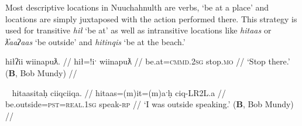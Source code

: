 \vspace{10pt}

Most descriptive locations in Nuuchahnulth are verbs, `be at a place' and locations are simply juxtaposed with the action performed there. This strategy is used for transitive \textit{hił} `be at' as well as intransitive locations like \textit{hitaas} or \textit{ƛ̓aaʔaas} `be outside' and \textit{hitinqis} `be at the beach.'

\ex \label{ex:stopthere}
\begingl
\glpreamble hiłʔii wiinapuƛ. //
\gla hił=!iˑ wiinapuƛ //
\glb be.at=\textsc{cmmd.2sg} stop.\textsc{mo} //
\glft `Stop there.' (\textbf{B}, Bob Mundy) //
\endgl
\xe

\begin{comment}
\ex \label{ex:workathome}
\begingl
\glpreamble hiłitin maḥt̓iiʔakqas mamuuk. //
\gla hił=(m)it=(m)in maḥt̓ii=ʔak=qaˑs mamuuk //
\glb be.at=\textsc{pst}=\textsc{strg.1pl} house=\textsc{poss}=\textsc{defn.1sg} work.\textsc{dr} //
\glft `We worked at my house.' (\textbf{N}, Fidelia Haiyupis) //
\endgl
\xe

\ex \label{ex:screamatbeach}
\begingl
\glpreamble n̓aʔiičiʔeƛ naʔuu łuucma ʕiikʕiika hitinqis. //
\gla n̓a-iˑčiƛ=!aƛ naʔuu łuucma ʕik-LR2L.a hitinqis //
\glb see-\textsc{in}=\textsc{now} be.with woman=\textsc{poss} scream-\textsc{rp} be.at.beach //
\glft `He heard a woman screaming on the beach.' (\textbf{C}, \textit{tupaat} Julia Lucas) //
\endgl
\xe
\end{comment}


\ex~ \label{ex:speakoutside}
\begingl
\glpreamble hitaasitaḥ ciiqciiqa. //
\gla hitaas=(m)it=(m)aˑḥ ciq-LR2L.a //
\glb be.outside=\textsc{pst}=\textsc{real.1sg} speak-\textsc{rp} //
\glft `I was outside speaking.' (\textbf{B}, Bob Mundy) //
\endgl
\xe

\begin{comment}
\ex~ \label{ex:speakoutside}
\begingl
\glpreamble qiiʔaƛintiis mamuuk ƛ̓aaʔaas. //
\gla qii=!aƛ=int=iis mamuuk ƛ̓aaʔaas //
\glb long.time=\textsc{now}=\textsc{pst}=\textsc{weak.1sg} work.\textsc{dr} be.outside //
\glft `I was working outside for a long time.' (\textbf{Q}, Sophie Billy) //
\endgl
\xe

\ex~ \label{ex:hideonroof}
\begingl
\glpreamble haptsaapaqƛiis suutił hiłaayiłkʷ. //
\gla hapt-saˑp=ʔaqƛ=iis sut-L.(č)ił hił-aˑyił=uk. //
\glb hide-\textsc{mo.caus}=\textsc{fut}=\textsc{weak.1sg} \textsc{2sg}-do.to be.at-on.a.roof=\textsc{poss} //
\glft `I will hide you on the roof.' (\textbf{Q}, Sophie Billy) //
\endgl
\xe
\end{comment}

